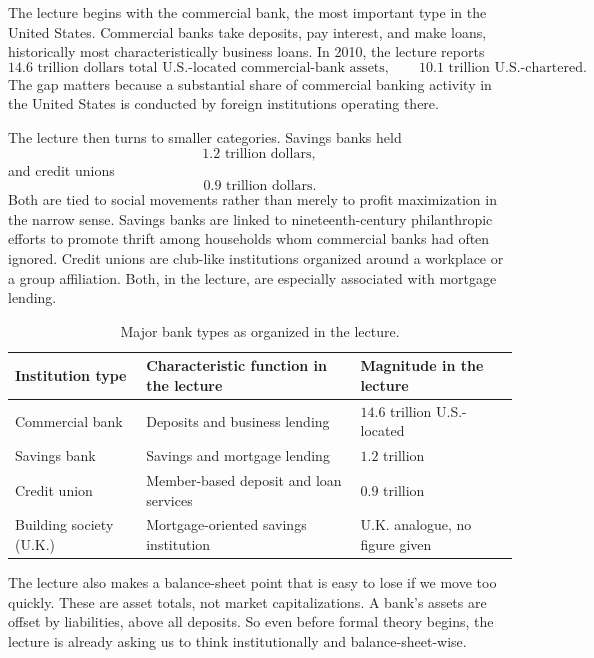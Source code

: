 The lecture begins with the commercial bank, the most important type in the United States. Commercial banks take deposits, pay interest, and make loans, historically most characteristically business loans. In 2010, the lecture reports
\begin{equation}
14.6\text{ trillion dollars total U.S.-located commercial-bank assets},\qquad
10.1\text{ trillion U.S.-chartered}.
\end{equation}
The gap matters because a substantial share of commercial banking activity in the United States is conducted by foreign institutions operating there.

The lecture then turns to smaller categories. Savings banks held
\begin{equation}
1.2\text{ trillion dollars},
\end{equation}
and credit unions
\begin{equation}
0.9\text{ trillion dollars}.
\end{equation}
Both are tied to social movements rather than merely to profit maximization in the narrow sense. Savings banks are linked to nineteenth-century philanthropic efforts to promote thrift among households whom commercial banks had often ignored. Credit unions are club-like institutions organized around a workplace or a group affiliation. Both, in the lecture, are especially associated with mortgage lending.

\begin{table}[h]
\centering
\begin{tabular}{|l|l|l|}
\hline
Institution type & Characteristic function in the lecture & Magnitude in the lecture \\
\hline
Commercial bank & Deposits and business lending & \(14.6\) trillion U.S.-located \\
\hline
Savings bank & Savings and mortgage lending & \(1.2\) trillion \\
\hline
Credit union & Member-based deposit and loan services & \(0.9\) trillion \\
\hline
Building society (U.K.) & Mortgage-oriented savings institution & U.K. analogue, no figure given \\
\hline
\end{tabular}
\caption{Major bank types as organized in the lecture.}
\end{table}

The lecture also makes a balance-sheet point that is easy to lose if we move too quickly. These are asset totals, not market capitalizations. A bank's assets are offset by liabilities, above all deposits. So even before formal theory begins, the lecture is already asking us to think institutionally and balance-sheet-wise.

